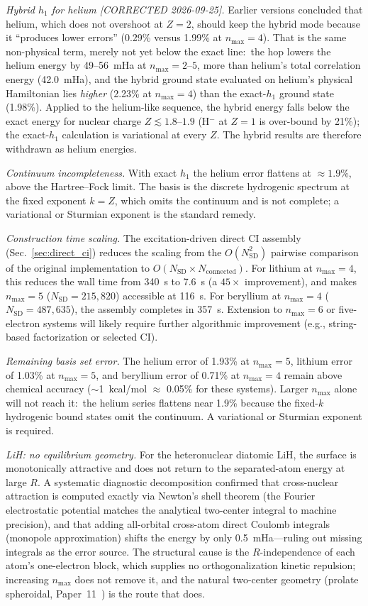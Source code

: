 \documentclass[aps,pra,twocolumn,superscriptaddress,longbibliography,floatfix]{revtex4-2}
\begin{document}
\emph{Hybrid $h_1$ for helium [CORRECTED 2026-09-25].}
Earlier versions concluded that helium, which does not overshoot at
$Z=2$, should keep the hybrid mode because it ``produces lower errors''
(0.29\% versus 1.99\% at $n_{\max}=4$).  That is the same non-physical
term, merely not yet below the exact line:\ the hop lowers the helium
energy by 49--56~mHa at $n_{\max}=2$--$5$, more than helium's total
correlation energy (42.0~mHa), and the hybrid ground state evaluated on
helium's physical Hamiltonian lies \emph{higher} (2.23\% at
$n_{\max}=4$) than the exact-$h_1$ ground state (1.98\%).  Applied to
the helium-like sequence, the hybrid energy falls below the exact energy
for nuclear charge $Z \lesssim 1.8$--$1.9$ (H$^-$ at $Z=1$ is over-bound
by 21\%); the exact-$h_1$ calculation is variational at every $Z$.  The
hybrid results are therefore withdrawn as helium energies.

\emph{Continuum incompleteness.}  With exact $h_1$ the helium error
flattens at $\approx\!1.9\%$, above the Hartree--Fock limit.  The
basis is the discrete hydrogenic spectrum at the fixed exponent $k=Z$,
which omits the continuum and is not complete; a variational or
Sturmian exponent is the standard remedy.

\emph{Construction time scaling.}
The excitation-driven direct CI assembly
(Sec.~\ref{sec:direct_ci}) reduces the scaling from the
$O(N_{\text{SD}}^2)$ pairwise comparison of the original
implementation to $O(N_{\text{SD}} \times N_{\text{connected}})$.
For lithium at $n_{\max}=4$, this reduces the wall time from
340~s to 7.6~s (a $45\times$ improvement), and makes $n_{\max}=5$
($N_{\text{SD}} = 215{,}820$) accessible at 116~s.
For beryllium at $n_{\max}=4$ ($N_{\text{SD}} = 487{,}635$), the
assembly completes in 357~s.
Extension to $n_{\max}=6$ or five-electron systems will likely
require further algorithmic improvement (e.g., string-based
factorization or selected CI).

\emph{Remaining basis set error.}
The helium error of 1.93\% at $n_{\max}=5$, lithium error of
1.03\% at $n_{\max}=5$, and beryllium error of 0.71\% at
$n_{\max}=4$ remain above chemical accuracy
($\sim$1~kcal/mol $\approx$ 0.05\% for these systems).
Larger $n_{\max}$ alone will not reach it:\ the helium series
flattens near 1.9\% because the fixed-$k$ hydrogenic bound states omit
the continuum.  A variational or Sturmian exponent is required.

\emph{LiH: no equilibrium geometry.}
For the heteronuclear diatomic LiH, the surface is monotonically
attractive and does not return to the separated-atom energy at large
$R$. A systematic diagnostic decomposition confirmed that cross-nuclear
attraction is computed exactly via Newton's shell theorem (the Fourier
electrostatic potential matches the analytical two-center integral to
machine precision), and that adding all-orbital cross-atom direct
Coulomb integrals (monopole approximation) shifts the energy by only
0.5~mHa---ruling out missing integrals as the error source.
The structural cause is the $R$-independence of each atom's
one-electron block, which supplies no orthogonalization kinetic
repulsion; increasing $n_{\max}$ does not remove it, and the natural
two-center geometry (prolate spheroidal, Paper~11~\cite{loutey_paper11})
is the route that does.
\end{document}
